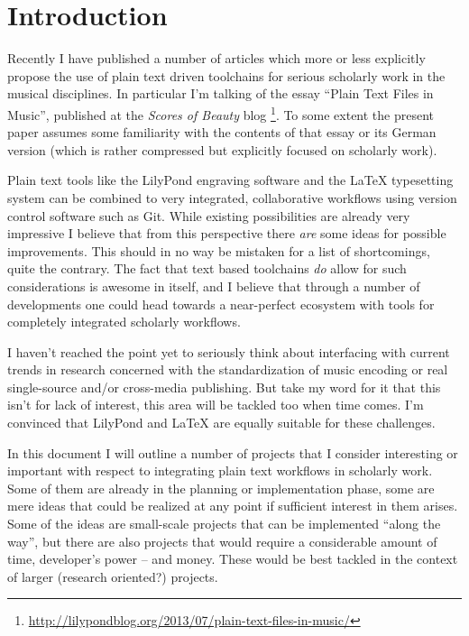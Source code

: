 \documentclass[oneside]{OLLbook}
\begin{document}
\author{Urs Liska}
\date{Version 1.1\\January 10, 2014} 
\maketitle

\section*{Introduction}

Recently I have published a number of articles which more or less explicitly propose the use of plain text driven toolchains for serious scholarly work in the musical disciplines.
In particular I'm talking of the essay “Plain Text Files in Music”, published at the \emph{Scores of Beauty} blog%
\footnote{\url{http://lilypondblog.org/2013/07/plain-text-files-in-music/}}.
To some extent the present paper assumes some familiarity with the contents of that essay or its German version (which is rather compressed but explicitly focused on scholarly work).

Plain text tools like the LilyPond engraving software and the \LaTeX{} typesetting system can be combined to very integrated, collaborative workflows using version control software such as Git.
While existing possibilities are already very impressive I believe that from this perspective there \emph{are} some ideas for possible improvements.
This should in no way be mistaken for a list of shortcomings, quite the contrary.
The fact that text based toolchains \emph{do} allow for such considerations is awesome in itself, and I believe that through a number of developments one could head towards a near-perfect ecosystem with tools for completely integrated scholarly workflows.

I haven't reached the point yet to seriously think about interfacing with current trends in research concerned with the standardization of music encoding or real single-source and/or cross-media publishing.
But take my word for it that this isn't for lack of interest, this area will be tackled too when time comes.
I'm convinced that LilyPond and \LaTeX{} are equally suitable for these challenges.

In this document I will outline a number of projects that I consider interesting or important with respect to integrating plain text workflows in scholarly work.
Some of them are already in the planning or implementation phase, some are mere ideas that could be realized at any point if sufficient interest in them arises.
Some of the ideas are small-scale projects that can be implemented “along the way”, but there are also projects that would require a considerable amount of time, developer's power -- and money.
These would be best tackled in the context of larger (research oriented?) projects.
\end{document}
